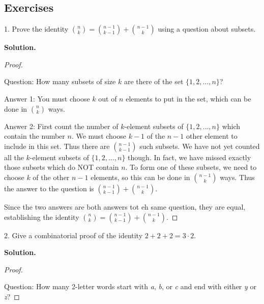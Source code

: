 \documentclass[10pt,]{book}
\theoremstyle{plain}
\theoremstyle{definition}
\theoremstyle{definition}
\theoremstyle{definition}
\numberwithin{equation}{section}
\begin{document}
\subsection[Exercises]{Exercises}\label{exercises-7}
\begin{exerciselist}
\item[1.]\hypertarget{exercise-72}{}
          Prove the identity \({n\choose k} = {n-1 \choose k-1} + {n-1 \choose k}\) using a question about subsets.
\par\smallskip
\par\smallskip
\noindent\textbf{Solution.}\hypertarget{solution-109}{}\quad
\begin{proof}\hypertarget{proof-7}{}

            Question: How many subsets of size \(k\) are there of the set \(\{1,2,\ldots, n\}\)?
\par

            Answer 1: You must choose \(k\) out of \(n\) elements to put in the set, which can be done in \({n \choose k}\) ways.
\par

            Answer 2: First count the number of \(k\)-element subsets of \(\{1,2,\ldots, n\}\) which contain the number \(n\). We must choose \(k-1\) of the \(n-1\) other element to include in this set. Thus there are \({n-1\choose k-1}\) such subsets. We have not yet counted all the \(k\)-element subsets of \(\{1,2,\ldots, n\}\) though. In fact, we have missed exactly those subsets which do NOT contain \(n\). To form one of these subsets, we need to choose \(k\) of the other \(n-1\) elements, so this can be done in \({n-1 \choose k}\) ways. Thus the answer to the question is \({n-1 \choose k-1} + {n-1 \choose k}\).
\par

             Since the two answers are both answers tot eh same question, they are equal, establishing the identity \({n\choose k} = {n-1 \choose k-1} + {n-1 \choose k}\).
\end{proof}
\item[2.]\hypertarget{exercise-73}{}
          Give a combinatorial proof of the identity \(2+2+2 = 3\cdot 2\).
\par\smallskip
\par\smallskip
\noindent\textbf{Solution.}\hypertarget{solution-110}{}\quad
\begin{proof}\hypertarget{proof-8}{}

            Question: How many 2-letter words start with \emph{a}, \emph{b}, or \emph{c} and end with either \emph{y} or \emph{z}?
\par


\end{proof}
\end{exerciselist}
\end{document}

